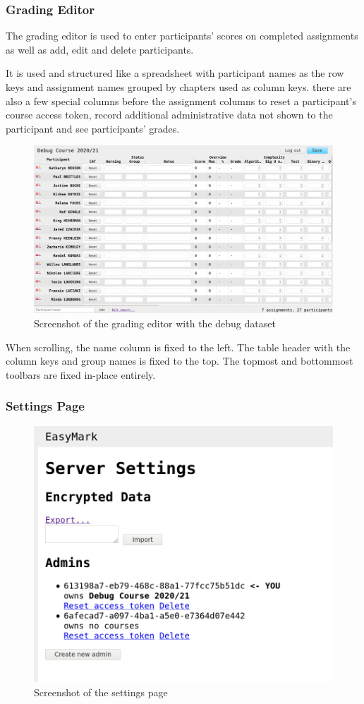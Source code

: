 \documentclass[12pt,a4paper,oneside]{report}
\begin{document}
	\subsubsection{Grading Editor}
	The grading editor is used to enter participants' scores on completed assignments as well as add, edit and delete participants.

	It is used and structured like a spreadsheet with participant names as the row keys and assignment names grouped by chapters used as column keys. there are also a few special columns before the assignment columns to reset a participant's course access token, record additional administrative data not shown to the participant and see participants' grades.

	\begin{figure}[h]
		\includegraphics[width=\textwidth]{easymark_grading_editor.png}
		\vskip0pt
		\caption{Screenshot of the grading editor with the debug dataset}
	\end{figure}

	When scrolling, the name column is fixed to the left. The table header with the column keys and group names is fixed to the top. The topmost and bottommost toolbars are fixed in-place entirely.

	\pagebreak
	\subsubsection{Settings Page}
	\begin{figure}
		\vskip-15pt
		\centering
		\includegraphics[width=.475\textwidth,trim=0 1cm 0 0,clip]{easymark_settings.png}
		\vskip0pt
		\caption{Screenshot of the settings page}
	\end{figure}
\end{document}
